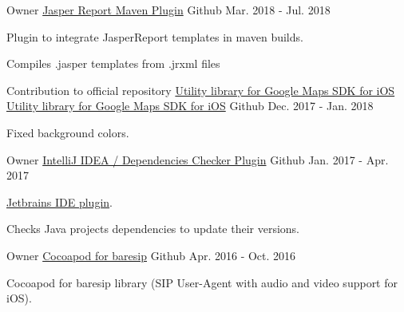 \begin{cventries}
  \cventry
    {Owner} %
    {\href{https://github.com/zp1ke/jasperreport-maven-plugin}{Jasper Report Maven Plugin}} %
    {\faGithubSquare\acvHeaderIconSep Github} %
    {Mar. 2018 - Jul. 2018} %
    {
      \begin{cvitems} %
        \item {Plugin to integrate JasperReport templates in maven builds.}
        \item {Compiles .jasper templates from .jrxml files}
      \end{cvitems}
    }

  \cventry
    {Contribution to official repository \href{https://github.com/googlemaps/google-maps-ios-utils}{Utility library for Google Maps SDK for iOS}} %
    {\faMapMarker \hphantom{-} \href{https://github.com/zp1ke/google-maps-ios-utils}{Utility library for Google Maps SDK for iOS}} %
    {\faGithubSquare\acvHeaderIconSep Github} %
    {Dec. 2017 - Jan. 2018} %
    {
      \begin{cvitems} %
        \item {Fixed background colors.}
      \end{cvitems}
    }

  \cventry
    {Owner} %
    {\href{https://github.com/zp1ke/deps-checker}{IntelliJ IDEA / Dependencies Checker Plugin}} %
    {\faGithubSquare\acvHeaderIconSep Github} %
    {Jan. 2017 - Apr. 2017} %
    {
      \begin{cvitems} %
        \item {\href{https://plugins.jetbrains.com/plugin/9481-java-dependencies-checker}{Jetbrains IDE plugin}.}
        \item {Checks Java projects dependencies to update their versions.}
      \end{cvitems}
    }

  \cventry
    {Owner} %
    {\faMobile \hphantom{-} \href{https://github.com/zp1ke/taresip}{Cocoapod for baresip}} %
    {\faGithubSquare\acvHeaderIconSep Github} %
    {Apr. 2016 - Oct. 2016} %
    {
      \begin{cvitems} %
        \item {Cocoapod for baresip library (SIP User-Agent with audio and video support for iOS).}
      \end{cvitems}
    }


\end{cventries}
